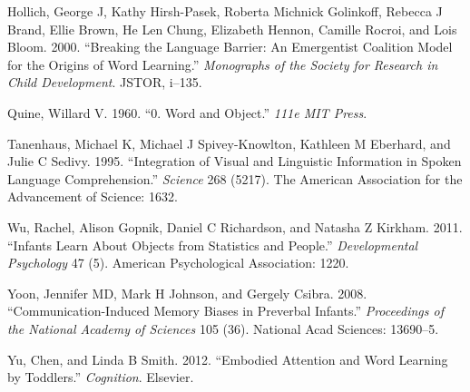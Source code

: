 \documentclass[]{elsarticle} %
\begin{document}
\hypertarget{ref-hollich2000breaking}{}
Hollich, George J, Kathy Hirsh-Pasek, Roberta Michnick Golinkoff,
Rebecca J Brand, Ellie Brown, He Len Chung, Elizabeth Hennon, Camille
Rocroi, and Lois Bloom. 2000. ``Breaking the Language Barrier: An
Emergentist Coalition Model for the Origins of Word Learning.''
\emph{Monographs of the Society for Research in Child Development}.
JSTOR, i--135.

\hypertarget{ref-quine19600}{}
Quine, Willard V. 1960. ``0. Word and Object.'' \emph{111e MIT Press}.

\hypertarget{ref-tanenhaus1995integration}{}
Tanenhaus, Michael K, Michael J Spivey-Knowlton, Kathleen M Eberhard,
and Julie C Sedivy. 1995. ``Integration of Visual and Linguistic
Information in Spoken Language Comprehension.'' \emph{Science} 268
(5217). The American Association for the Advancement of Science: 1632.

\hypertarget{ref-wu2011infants}{}
Wu, Rachel, Alison Gopnik, Daniel C Richardson, and Natasha Z Kirkham.
2011. ``Infants Learn About Objects from Statistics and People.''
\emph{Developmental Psychology} 47 (5). American Psychological
Association: 1220.

\hypertarget{ref-yoon2008communication}{}
Yoon, Jennifer MD, Mark H Johnson, and Gergely Csibra. 2008.
``Communication-Induced Memory Biases in Preverbal Infants.''
\emph{Proceedings of the National Academy of Sciences} 105 (36).
National Acad Sciences: 13690--5.

\hypertarget{ref-yu2012embodied}{}
Yu, Chen, and Linda B Smith. 2012. ``Embodied Attention and Word
Learning by Toddlers.'' \emph{Cognition}. Elsevier.
\end{document}
